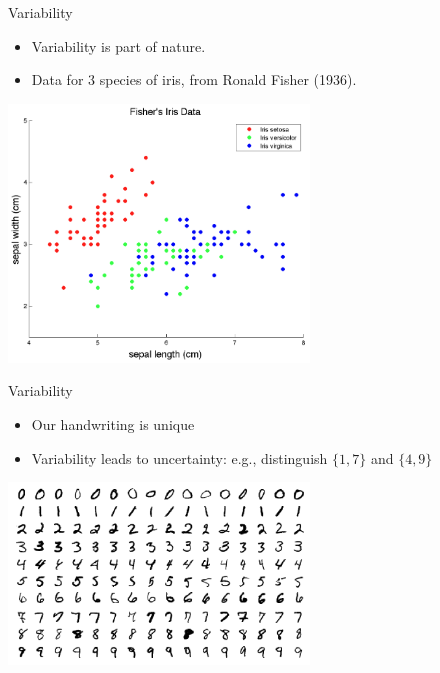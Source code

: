 \documentclass{beamer}
\begin{document}
\begin{frame}{Variability}
\begin{itemize}
  \item Variability is part of nature.
  \item Data for 3 species of iris, from Ronald Fisher (1936).
\end{itemize}
\begin{center}
  \includegraphics[width=0.6\textwidth]{iris_data.png}
\end{center}
\end{frame}

\begin{frame}{Variability}
\begin{itemize}
  \item Our handwriting is unique
  \item Variability leads to uncertainty: e.g., distinguish $\{1,7\}$ and $\{4,9\}$
\end{itemize}
\begin{center}
  \includegraphics[width=0.6\textwidth]{handwriting_example.png}
\end{center}
\end{frame}
\end{document}
